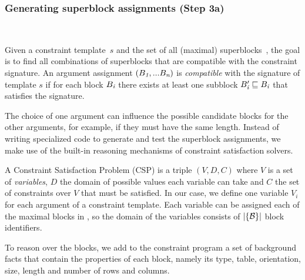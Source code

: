 \subsubsection{Generating superblock assignments (Step 3a)}
\label{sec:algo:super}
\

Given a constraint template~$s$ and the set of all (maximal) superblocks~\blocks, the goal is to find all combinations of superblocks that are compatible with the constraint signature.
An argument assignment $(B_{\textit{1}}, ... B_{\textit{n}})$ is \textit{compatible} with the signature of template $s$ if for each block $B_{\textit{i}}$ there exists at least one subblock $B_{\textit{i}}' \sqsubseteq B_{\textit{i}}$ that satisfies the signature.

The choice of one argument can influence the possible candidate blocks for the other arguments, for example, if they must have the same length.
Instead of writing specialized code to generate and test the superblock assignments, we make use of the built-in reasoning mechanisms of constraint satisfaction solvers.

A Constraint Satisfaction Problem (CSP) is a triple $(V,D,C)$ where $V$ is a set of \textit{variables}, $D$ the domain of possible values each variable can take and $C$ the set of constraints over $V$ that must be satisfied.
In our case, we define one variable $V_i$ for each argument of a constraint template.
Each variable can be assigned each of the maximal blocks in \blocks, so the domain of the variables consists of $|\{\mathcal{B}\}|$ block identifiers.


To reason over the blocks, we add to the constraint program a set of background facts that contain the properties of each block, namely its type, table, orientation, size, length and number of rows and columns.

